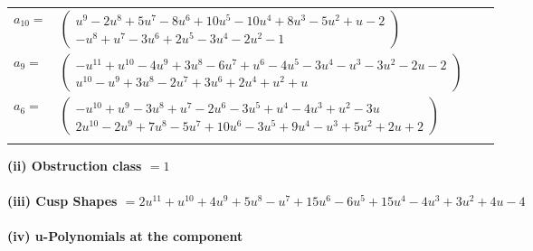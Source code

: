 \documentclass[1p]{elsarticle_modified}
\theoremstyle{definition}
\begin{document}
\begin{tabular}{m{7pt} m{180pt} m{7pt} m{180pt} }
\flushright $a_{10}=$&$\begin{pmatrix}u^9-2 u^8+5 u^7-8 u^6+10 u^5-10 u^4+8 u^3-5 u^2+u-2\\- u^8+u^7-3 u^6+2 u^5-3 u^4-2 u^2-1\end{pmatrix}$ \\
\flushright $a_{9}=$&$\begin{pmatrix}- u^{11}+u^{10}-4 u^9+3 u^8-6 u^7+u^6-4 u^5-3 u^4- u^3-3 u^2-2 u-2\\u^{10}- u^9+3 u^8-2 u^7+3 u^6+2 u^4+u^2+u\end{pmatrix}$ \\
\flushright $a_{6}=$&$\begin{pmatrix}- u^{10}+u^9-3 u^8+u^7-2 u^6-3 u^5+u^4-4 u^3+u^2-3 u\\2 u^{10}-2 u^9+7 u^8-5 u^7+10 u^6-3 u^5+9 u^4- u^3+5 u^2+2 u+2\end{pmatrix}$\\&\end{tabular}
\flushleft \textbf{(ii) Obstruction class $= 1$}\\~\\
\flushleft \textbf{(iii) Cusp Shapes $= 2 u^{11}+u^{10}+4 u^9+5 u^8- u^7+15 u^6-6 u^5+15 u^4-4 u^3+3 u^2+4 u-4$}\\~\\
\newpage\renewcommand{\arraystretch}{1}
\flushleft \textbf{(iv) u-Polynomials at the component}\newline \\
\end{document}
